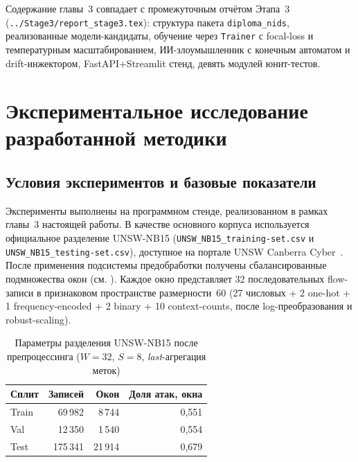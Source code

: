 \documentclass[14pt, a4paper]{extarticle}
\begin{document}
Содержание главы~3 совпадает с промежуточным отчётом Этапа~3
(\verb|../Stage3/report_stage3.tex|): структура пакета \texttt{diploma\_nids},
реализованные модели-кандидаты, обучение через \texttt{Trainer} с
focal-loss и температурным масштабированием, ИИ-злоумышленник с конечным
автоматом и drift-инжектором, FastAPI+Streamlit стенд, девять модулей
юнит-тестов.

\section{Экспериментальное исследование разработанной методики}
\label{ch:experiments}

\subsection{Условия экспериментов и базовые показатели}

Эксперименты выполнены на программном стенде, реализованном в рамках
главы~3 настоящей работы. В качестве основного корпуса используется
официальное разделение UNSW-NB15 (\verb|UNSW_NB15_training-set.csv| и
\verb|UNSW_NB15_testing-set.csv|), доступное на портале UNSW Canberra
Cyber~\cite{moustafa2015unsw, unswportal}. После применения подсистемы
предобработки получены сбалансированные подмножества окон (см.
). Каждое окно представляет 32 последовательных
flow-записи в признаковом пространстве размерности~60 (27 числовых +
2 one-hot + 1 frequency-encoded + 2 binary + 10 context-counts, после
log-преобразования и robust-scaling).

\begin{table}[H]
\centering
\caption{Параметры разделения UNSW-NB15 после препроцессинга
(\(W = 32\), \(S = 8\), \emph{last}-агрегация меток)}
\label{tab:dataset-stats}
\renewcommand{\arraystretch}{1.2}
\begin{tabular}{lrrr}
\toprule
\textbf{Сплит} & \textbf{Записей} & \textbf{Окон} & \textbf{Доля атак, окна} \\
\midrule
Train & 69\,982   & 8\,744   & 0{,}551 \\
Val   & 12\,350   & 1\,540   & 0{,}554 \\
Test  & 175\,341  & 21\,914  & 0{,}679 \\
\bottomrule
\end{tabular}
\end{table}
\end{document}
